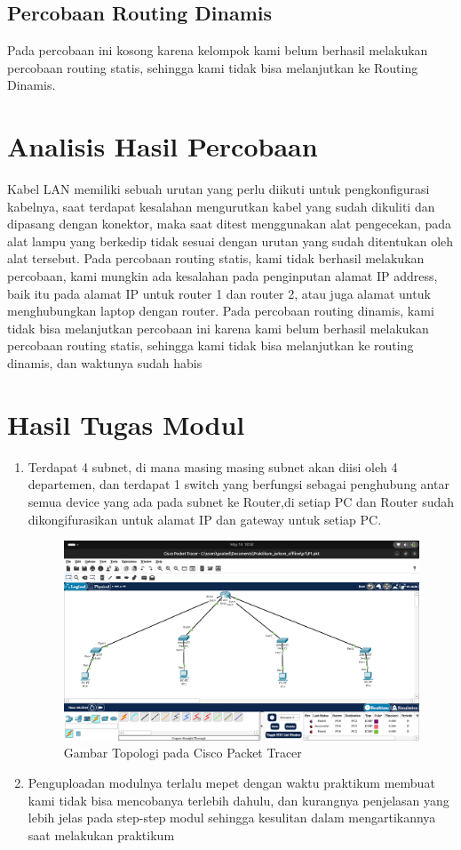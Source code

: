 \subsection{Percobaan Routing Dinamis}
Pada percobaan ini kosong karena kelompok kami belum berhasil melakukan percobaan routing statis,
sehingga kami tidak bisa melanjutkan ke Routing Dinamis.

\section{Analisis Hasil Percobaan}
Kabel LAN memiliki sebuah urutan yang perlu diikuti untuk pengkonfigurasi kabelnya, saat terdapat kesalahan
mengurutkan kabel yang sudah dikuliti dan dipasang dengan konektor, maka saat ditest menggunakan alat 
pengecekan, pada alat lampu yang berkedip tidak sesuai dengan urutan yang sudah ditentukan oleh alat tersebut.
Pada percobaan routing statis, kami tidak berhasil melakukan percobaan, kami mungkin ada kesalahan pada penginputan 
alamat IP address, baik itu pada alamat IP untuk router 1 dan router 2, atau juga alamat untuk menghubungkan
laptop dengan router. Pada percobaan routing dinamis, kami tidak bisa melanjutkan percobaan ini karena kami belum berhasil
melakukan percobaan routing statis, sehingga kami tidak bisa melanjutkan ke routing dinamis, dan waktunya
sudah habis
\section{Hasil Tugas Modul}
\begin{enumerate}
    \item Terdapat 4 subnet, di mana masing masing subnet akan diisi oleh 4 departemen, dan terdapat 1 switch
    yang berfungsi sebagai penghubung antar semua device yang ada pada subnet ke Router,di setiap PC dan Router
    sudah dikongifurasikan untuk alamat IP dan gateway untuk setiap PC. 
	\begin{figure}[H]
		\centering
		\includegraphics[width=0.5\linewidth]{cisco.png}
		\caption{Gambar Topologi pada Cisco Packet Tracer}
		\label{fig:gambar1}
	\end{figure}
    \item Penguploadan modulnya terlalu mepet dengan waktu praktikum membuat kami tidak bisa mencobanya terlebih dahulu, dan kurangnya penjelasan yang lebih jelas 
    pada step-step modul sehingga kesulitan dalam mengartikannya saat melakukan praktikum
\end{enumerate}



